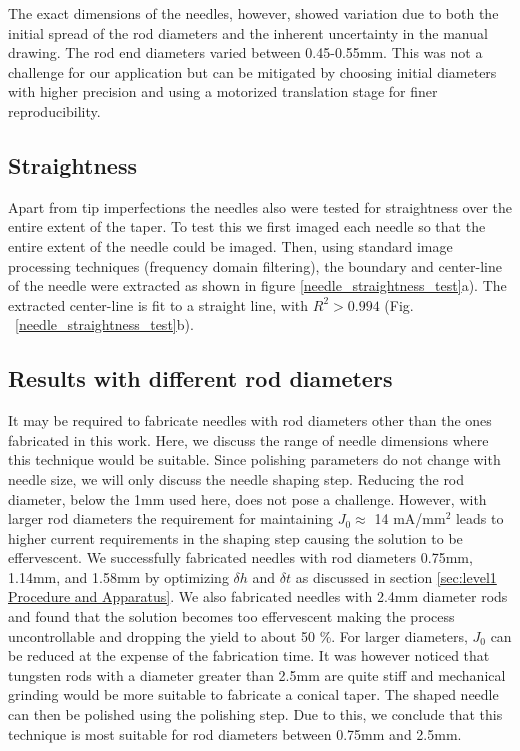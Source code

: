 \documentclass[%
 aip,
 amsmath,amssymb,
 reprint,%
]{revtex4-1}
\begin{document}
The exact dimensions of the needles, however, showed variation due to both the initial spread of the rod diameters and the inherent uncertainty in the manual drawing. 
The rod end diameters varied between 0.45-0.55mm.
This was not a challenge for our application but can be mitigated by choosing initial diameters with higher precision and using a motorized translation stage for finer reproducibility.



\subsection{Straightness}
Apart from tip imperfections the needles also were tested for straightness over the entire extent of the taper.
To test this we first imaged each needle so that the entire extent of the needle could be imaged. 
Then, using standard image processing techniques\cite{CompVision} (frequency domain filtering), the boundary and center-line of the needle were extracted as shown in figure \ref{needle_straightness_test}a). 
The extracted center-line is fit to a straight line, with $R^2>0.994$ (Fig. ~\ref{needle_straightness_test}b).

\subsection{ Results with different rod diameters }
It may be required to fabricate needles with rod diameters other than the ones fabricated in this work.
Here, we discuss the range of needle dimensions where this technique would be suitable.
Since polishing parameters do not change with needle size, we will only discuss the needle shaping step.
Reducing the rod diameter, below the 1mm used here, does not pose a challenge.
However, with larger rod diameters the requirement for maintaining  $J_0 \approx$ 14 mA/mm$^2$ leads to higher current requirements in the shaping step causing the solution to be effervescent.
We successfully fabricated needles with rod diameters 0.75mm, 1.14mm, and 1.58mm by optimizing $\delta h$ and $\delta t$ as discussed in section \ref{sec:level1 Procedure and Apparatus}.
We also fabricated needles with 2.4mm diameter rods and found that the solution becomes too effervescent making the process uncontrollable and dropping the yield to about 50 \%.
For larger diameters, $J_0$ can be reduced at the expense of the fabrication time.
It was however noticed that tungsten rods with a diameter greater than 2.5mm are quite stiff and mechanical grinding would be more suitable to fabricate a conical taper.
The shaped needle can then be polished using the polishing step.
Due to this, we conclude that this technique is most suitable for rod diameters between 0.75mm and 2.5mm.
\end{document}

